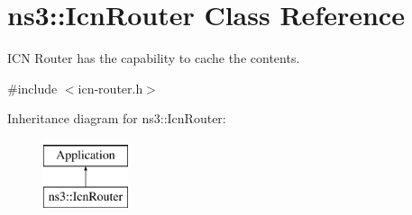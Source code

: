 \hypertarget{classns3_1_1IcnRouter}{\section{ns3\-:\-:Icn\-Router Class Reference}
\label{classns3_1_1IcnRouter}
}


I\-C\-N Router has the capability to cache the contents.  




{\ttfamily \#include $<$icn-\/router.\-h$>$}

Inheritance diagram for ns3\-:\-:Icn\-Router\-:\begin{figure}[H]
\begin{center}
\leavevmode
\includegraphics[height=2.000000cm]{classns3_1_1IcnRouter}
\end{center}
\end{figure}
